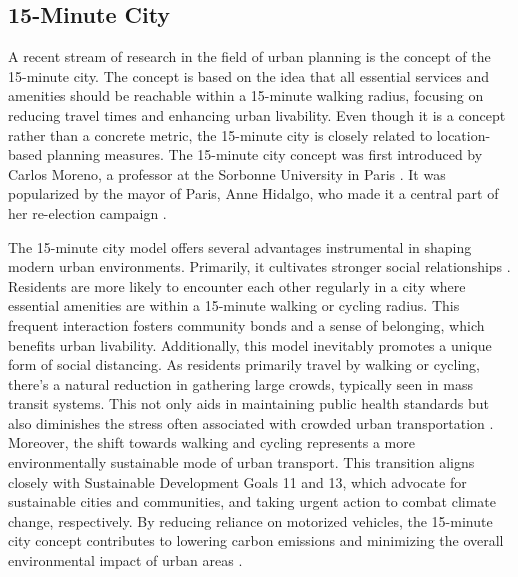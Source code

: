 \subsection{15-Minute City}
\label{subsec:15_minute_city}


A recent stream of research in the field of urban planning is the concept of the 15-minute city.
The concept is based on the idea that all essential services and amenities should be reachable within a 15-minute walking radius, focusing on reducing travel times and enhancing urban livability.
Even though it is a concept rather than a concrete metric, the 15-minute city is closely related to location-based planning measures.
The 15-minute city concept was first introduced by Carlos Moreno, a professor at the Sorbonne University in Paris .
It was popularized by the mayor of Paris, Anne Hidalgo, who made it a central part of her re-election campaign .

The 15-minute city model offers several advantages instrumental in shaping modern urban environments.
Primarily, it cultivates stronger social relationships .
Residents are more likely to encounter each other regularly in a city where essential amenities are within a 15-minute walking or cycling radius. 
This frequent interaction fosters community bonds and a sense of belonging, which benefits urban livability.
Additionally, this model inevitably promotes a unique form of social distancing. 
As residents primarily travel by walking or cycling, there's a natural reduction in gathering large crowds, typically seen in mass transit systems. 
This not only aids in maintaining public health standards but also diminishes the stress often associated with crowded urban transportation .
Moreover, the shift towards walking and cycling represents a more environmentally sustainable mode of urban transport. 
This transition aligns closely with Sustainable Development Goals 11 and 13, which advocate for sustainable cities and communities, and taking urgent action to combat climate change, respectively. 
By reducing reliance on motorized vehicles, the 15-minute city concept contributes to lowering carbon emissions and minimizing the overall environmental impact of urban areas .

